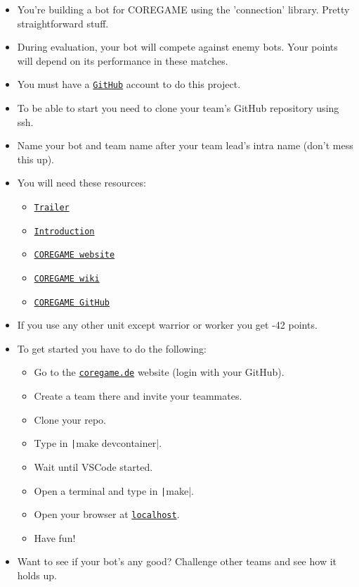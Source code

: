 \documentclass[12pt]{article}
\begin{document}
\begin{itemize}
  \item You're building a bot for COREGAME using the 'connection' library. Pretty straightforward stuff.

  \item During evaluation, your bot will compete against enemy bots. Your points will depend on its performance in these matches.

  \item You must have a \href{https://github.com}{\texttt{GitHub}} account to do this project.

  \item To be able to start you need to clone your team's GitHub repository using ssh.

  \item Name your bot and team name after your team lead's intra name (don't mess this up).

  \item You will need these resources:
  \begin{itemize}
    \item \href{https://youtu.be/gMmBgHnb8Nc?si=Thm0HOCfNIZbfCnI}{\texttt{Trailer}}
    \item \href{https://shattereddisk.github.io/rickroll/rickroll.mp4}{\texttt{Introduction}}
    \item \href{https://coregame.de}{\texttt{COREGAME website}}
    \item \href{https://42core-team.github.io/rush02-wiki/#/}{\texttt{COREGAME wiki}}
    \item \href{https://github.com/42core-team}{\texttt{COREGAME GitHub}}
  \end{itemize}

  \item If you use any other unit except warrior or worker you get -42 points.

  \newpage

  \item To get started you have to do the following:
  \begin{itemize}
    \item Go to the \href{https://coregame.de}{\texttt{coregame.de}} website (login with your GitHub).
    \item Create a team there and invite your teammates.
    \item Clone your repo.
    \item Type in \texttt|make devcontainer|.
    \item Wait until VSCode started.
    \item Open a terminal and type in \texttt|make|.
    \item Open your browser at \href{http://localhost}{\texttt{localhost}}.
    \item Have fun!
  \end{itemize}

  \item Want to see if your bot's any good? Challenge other teams and see how it holds up.
\end{itemize}
\end{document}
